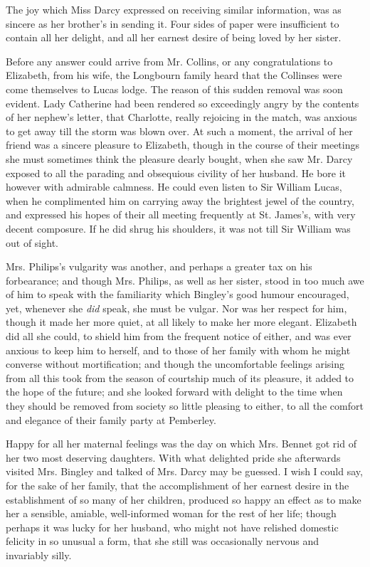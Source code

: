 The joy which Miss Darcy expressed on receiving similar
information, was as sincere as her brother’s in sending it.
Four sides of paper were insufficient to contain all her
delight, and all her earnest desire of being loved by her
sister.

Before any answer could arrive from Mr. Collins, or any
congratulations to Elizabeth, from his wife, the Longbourn
family heard that the Collinses were come themselves to
Lucas lodge. The reason of this sudden removal was soon
evident. Lady Catherine had been rendered so exceedingly
angry by the contents of her nephew’s letter, that
Charlotte, really rejoicing in the match, was anxious to
get away till the storm was blown over. At such a moment,
the arrival of her friend was a sincere pleasure to Elizabeth,
though in the course of their meetings she must sometimes
think the pleasure dearly bought, when she saw Mr. Darcy
exposed to all the parading and obsequious civility of her
husband. He bore it however with admirable calmness.
He could even listen to Sir William Lucas, when he complimented
him on carrying away the brightest jewel of
the country, and expressed his hopes of their all meeting
frequently at St. James’s, with very decent composure.
If he did shrug his shoulders, it was not till Sir William
was out of sight.

Mrs. Philips’s vulgarity was another, and perhaps a
great\-er tax on his forbearance; and though Mrs. Philips,
as well as her sister, stood in too much awe of him to
speak with the familiarity which Bingley’s good humour
encouraged, yet, whenever she \textit{did} speak, she must be
vulgar. Nor was her respect for him, though it made her
more quiet, at all likely to make her more elegant. Elizabeth
did all she could, to shield him from the frequent
notice of either, and was ever anxious to keep him to
herself, and to those of her family with whom he might
converse without mortification; and though the uncomfortable
feelings arising from all this took from the season
of courtship much of its pleasure, it added to the hope of the
future; and she looked forward with delight to the time
when they should be removed from society so little
pleasing to either, to all the comfort and elegance of their
family party at Pemberley.


Happy for all her maternal feelings was the day on
which Mrs. Bennet got rid of her two most deserving
daughters. With what delighted pride she afterwards
visited Mrs. Bingley and talked of Mrs. Darcy may be
guessed. I wish I could say, for the sake of her family,
that the accomplishment of her earnest desire in the
establishment of so many of her children, produced so
happy an effect as to make her a sensible, amiable, well-informed
woman for the rest of her life; though perhaps
it was lucky for her husband, who might not have relished
domestic felicity in so unusual a form, that she still was
occasionally nervous and invariably silly.

